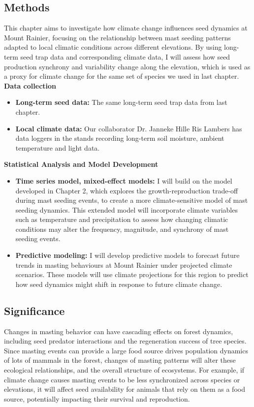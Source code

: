 \documentclass[11pt,letter]{article}
\begin{document}
\subsection{Methods}
This chapter aims to investigate how climate change influences seed dynamics at Mount Rainier, focusing on the relationship between mast seeding patterns adapted to local climatic conditions across different elevations. By using long-term seed trap data and corresponding climate data, I will assess how seed production synchrony and variability change along the elevation, which is used as a proxy for climate change for the same set of species we used in last chapter.
\textbf{Data collection}
\begin{itemize}
\item\textbf{Long-term seed data:} The same long-term seed trap data from last chapter.
\item\textbf{Local climate data:}  Our collaborator Dr. Janneke Hille Ris Lambers has data loggers in the stands recording long-term soil moisture, ambient temperature and light data.
\end{itemize}
\textbf{Statistical Analysis and Model Development}
\begin{itemize}
\item\textbf{Time series model, mixed-effect models:} I will build on the model developed in Chapter 2, which explores the growth-reproduction trade-off during mast seeding events, to create a more climate-sensitive model of mast seeding dynamics. This extended model will incorporate climate variables such as temperature and precipitation to assess how changing climatic conditions may alter the frequency, magnitude, and synchrony of mast seeding events.
\item\textbf{Predictive modeling:} I will develop predictive models to forecast future trends in masting behaviours at Mount Rainier under projected climate scenarios. These models will use climate projections for this region to predict how seed dynamics might shift in response to future climate change.
\end{itemize}
\subsection{Significance}
Changes in masting behavior can have cascading effects on forest dynamics, including seed predator interactions and the regeneration success of tree species. Since masting events can provide a large food source drives population dynamics of lots of mammals in the forest, changes of masting patterns will alter these ecological relationships, and the overall structure of ecosystems. For example, if climate change causes masting events to be less synchronized across species or elevations, it will affect seed availability for animals that rely on them as a food source, potentially impacting their survival and reproduction.
\end{document}
